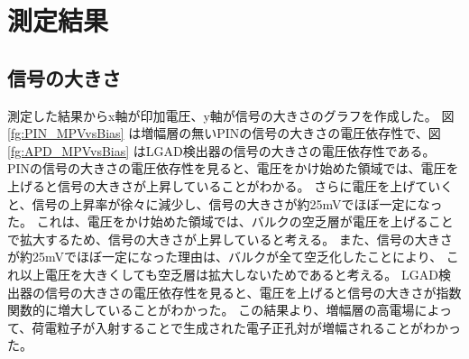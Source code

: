 \section{測定結果}

\subsection{信号の大きさ}
測定した結果からx軸が印加電圧、y軸が信号の大きさのグラフを作成した。
図\ref{fg:PIN_MPVvsBias} は増幅層の無いPINの信号の大きさの電圧依存性で、図\ref{fg:APD_MPVvsBias} はLGAD検出器の信号の大きさの電圧依存性である。
PINの信号の大きさの電圧依存性を見ると、電圧をかけ始めた領域では、電圧を上げると信号の大きさが上昇していることがわかる。
さらに電圧を上げていくと、信号の上昇率が徐々に減少し、信号の大きさが約25mVでほぼ一定になった。
これは、電圧をかけ始めた領域では、バルクの空乏層が電圧を上げることで拡大するため、信号の大きさが上昇していると考える。
また、信号の大きさが約25mVでほぼ一定になった理由は、バルクが全て空乏化したことにより、
これ以上電圧を大きくしても空乏層は拡大しないためであると考える。
LGAD検出器の信号の大きさの電圧依存性を見ると、電圧を上げると信号の大きさが指数関数的に増大していることがわかった。
この結果より、増幅層の高電場によって、荷電粒子が入射することで生成された電子正孔対が増幅されることがわかった。


